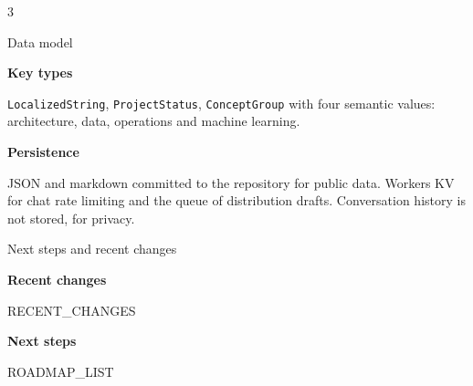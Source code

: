 \documentclass[10pt]{article}
\newcommand{\posterheading}[1]{%
  \vspace{4pt}%
  \par{\color{accentdark}\sffamily\bfseries #1}\par
  \vspace{2pt}%
}
\begin{document}
\begin{multicols}{3}
\begin{posterblock}{Data model}
\posterheading{Key types}
\texttt{LocalizedString}, \texttt{ProjectStatus}, \texttt{ConceptGroup} with four semantic values: architecture, data, operations and machine learning.

\posterheading{Persistence}
JSON and markdown committed to the repository for public data. Workers KV for chat rate limiting and the queue of distribution drafts. Conversation history is not stored, for privacy.
\end{posterblock}

\begin{posterblock}{Next steps and recent changes}
\posterheading{Recent changes}
{{RECENT_CHANGES}}

\posterheading{Next steps}
{{ROADMAP_LIST}}
\end{posterblock}

\end{multicols}
\end{document}
